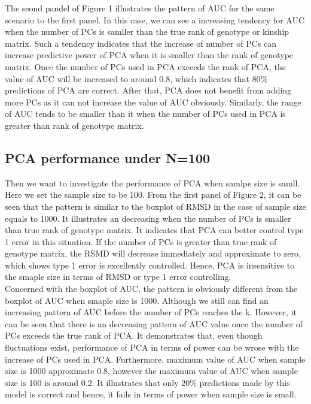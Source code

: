 \documentclass[12pt]{article}
\begin{document}
The seond pandel of Figure 1 illustrates the pattern of AUC for the same scenario to the first panel. In this case, we can see a increasing tendency for AUC when the number of PCs is samller than the true rank of genotype or kinship matrix. Such a tendency indicates that the increase of number of PCs can increase predictive power of PCA when it is smaller than the rank of genotype matrix. Once the number of PCs used in PCA exceeds the rank of PCA, the value of AUC will be increased to around 0.8, which indicates that $80\%$ predictions of PCA are correct. After that, PCA does not benefit from adding more PCs as it can not increase the value of AUC obviously. Similarly, the range of AUC tends to be smaller than it when the number of PCs used in PCA is greater than rank of genotype matrix. \\



\subsection{PCA performance under N=100}

Then we want to investigate the performance of PCA when samlpe size is samll. Here we set the sample size to be 100. From the first panel of Figure 2, it can be seen that the pattern is similar to the boxplot of RMSD in the case of sample size equals to 1000. It illustrates an decreasing when the number of PCs is smaller than true rank of genotype matrix. It indicates that PCA can better control type 1 error in this situation. If the number of PCs is greater than true rank of genotype matrix, the RSMD will decrease immediately and approximate to zero, which shows type 1 error is excellently controlled. Hence, PCA is insensitive to the smaple size in terms of RMSD or type 1 error controlling. \\

Concerned with the boxplot of AUC, the pattern is obviously different from the boxplot of AUC when smaple size is 1000. Although we still can find an increasing pattern of AUC before the number of PCs reaches the k. However, it can be seen that there is an decreasing pattern of AUC value once the number of PCs exceeds the true rank of PCA. It demonstrates that, even though fluctuations exist, performance of PCA in terms of power can be wrose with the increase of PCs used in PCA. Furthermore, maximum value of AUC when sample size is 1000 approximate 0.8, however the maximum value of AUC when sample size is 100 is around 0.2. It illustrates that only $20\%$ predictions made by this model is correct and hence, it fails in terms of power when sample size is small. \\
\end{document}
